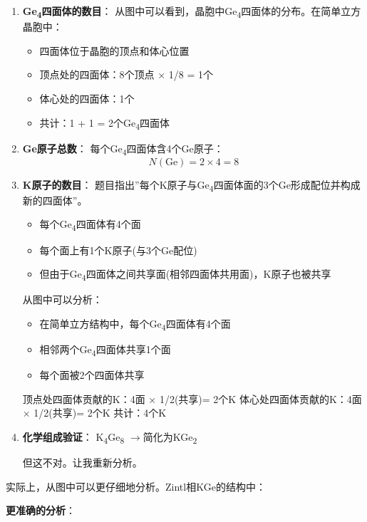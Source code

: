 \documentclass[a4paper,11pt]{ctexart}
\providecommand{\tightlist}{\setlength{\itemsep}{0pt}\setlength{\parskip}{0pt}}
\newcommand{\箭}{\ensuremath{\rightarrow}}
\newcommand{\左箭}{\ensuremath{\leftarrow}}
\newcommand{\上箭}{\ensuremath{\uparrow}}
\newcommand{\下箭}{\ensuremath{\downarrow}}
\newcommand{\衡}{\ensuremath{\rightleftharpoons}}
\newcommand{\双箭}{\ensuremath{\leftrightarrow}}
\newcommand{\约等于}{\ensuremath{\approx}}
\newcommand{\小于等于}{\ensuremath{\leq}}
\newcommand{\大于等于}{\ensuremath{\geq}}
\newcommand{\不等于}{\ensuremath{\neq}}
\newcommand{\西格马}{\ensuremath{\sigma}}
\newcommand{\派}{\ensuremath{\pi}}
\begin{document}
\begin{enumerate}
\def\labelenumi{\arabic{enumi}.}
\item
  \textbf{Ge\textsubscript{4}四面体的数目}：
  从图中可以看到，晶胞中Ge\textsubscript{4}四面体的分布。在简单立方晶胞中：

  \begin{itemize}
  \tightlist
  \item
    四面体位于晶胞的顶点和体心位置
  \item
    顶点处的四面体：8个顶点 × 1/8 = 1个
  \item
    体心处的四面体：1个
  \item
    共计：1 + 1 = 2个Ge\textsubscript{4}四面体
  \end{itemize}
\item
  \textbf{Ge原子总数}：
  每个Ge\textsubscript{4}四面体含4个Ge原子：
  \[N(\text{Ge}) = 2 \times 4 = 8\]
\item
  \textbf{K原子的数目}：
  题目指出''每个K原子与Ge\textsubscript{4}四面体面的3个Ge形成配位并构成新的四面体''。

  \begin{itemize}
  \tightlist
  \item
    每个Ge\textsubscript{4}四面体有4个面
  \item
    每个面上有1个K原子(与3个Ge配位)
  \item
    但由于Ge\textsubscript{4}四面体之间共享面(相邻四面体共用面)，K原子也被共享
  \end{itemize}

  从图中可以分析：

  \begin{itemize}
  \tightlist
  \item
    在简单立方结构中，每个Ge\textsubscript{4}四面体有4个面
  \item
    相邻两个Ge\textsubscript{4}四面体共享1个面
  \item
    每个面被2个四面体共享
  \end{itemize}

  顶点处四面体贡献的K：4面 × 1/2(共享)= 2个K
  体心处四面体贡献的K：4面 × 1/2(共享)= 2个K
  共计：4个K
\item
  \textbf{化学组成验证}：
  K\textsubscript{4}Ge\textsubscript{8} \箭 简化为KGe\textsubscript{2}

  但这不对。让我重新分析。
\end{enumerate}

实际上，从图中可以更仔细地分析。Zintl相KGe的结构中：

\textbf{更准确的分析}：
\end{document}
